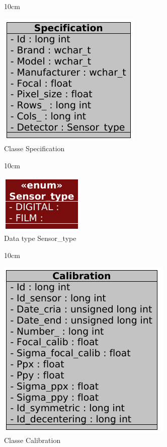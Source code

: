 \begin{figure}[!ht]{10cm}
  \caption{Classe Specification} \label{spec}
  \centering
  \includegraphics[width=0.5\hsize]{figuras/42.png}
\end{figure}

\begin{figure}[!ht]{10cm}
  \caption{Data type Sensor\_type } \label{typesensor}
  \centering
  \includegraphics[width=0.4\hsize]{figuras/45.png}
\end{figure}

\begin{figure}[!ht]{10cm}
  \caption{Classe Calibration} \label{calib}
  \centering
  \includegraphics[width=0.6\hsize]{figuras/39.png}
\end{figure}

